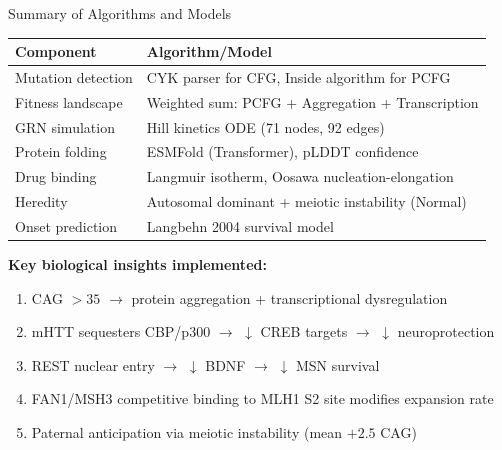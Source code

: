 \documentclass[aspectratio=169,11pt]{beamer}
\begin{document}
\begin{frame}{Summary of Algorithms and Models}
    \begin{tabular}{p{4.5cm}|p{7cm}}
        \toprule
        \textbf{Component} & \textbf{Algorithm/Model} \\
        \midrule
        Mutation detection & CYK parser for CFG, Inside algorithm for PCFG \\
        Fitness landscape  & Weighted sum: PCFG + Aggregation + Transcription \\
        GRN simulation     & Hill kinetics ODE (71 nodes, 92 edges) \\
        Protein folding    & ESMFold (Transformer), pLDDT confidence \\
        Drug binding       & Langmuir isotherm, Oosawa nucleation-elongation \\
        Heredity           & Autosomal dominant + meiotic instability (Normal) \\
        Onset prediction   & Langbehn 2004 survival model \\
        \bottomrule
    \end{tabular}

    \vspace{0.5cm}
    \textbf{Key biological insights implemented:}
    \begin{enumerate}
        \item CAG $>35$ $\to$ protein aggregation + transcriptional dysregulation
        \item mHTT sequesters CBP/p300 $\to$ $\downarrow$ CREB targets $\to$ $\downarrow$ neuroprotection
        \item REST nuclear entry $\to$ $\downarrow$ BDNF $\to$ $\downarrow$ MSN survival
        \item FAN1/MSH3 competitive binding to MLH1 S2 site modifies expansion rate
        \item Paternal anticipation via meiotic instability (mean $+2.5$ CAG)
    \end{enumerate}
\end{frame}
\end{document}

